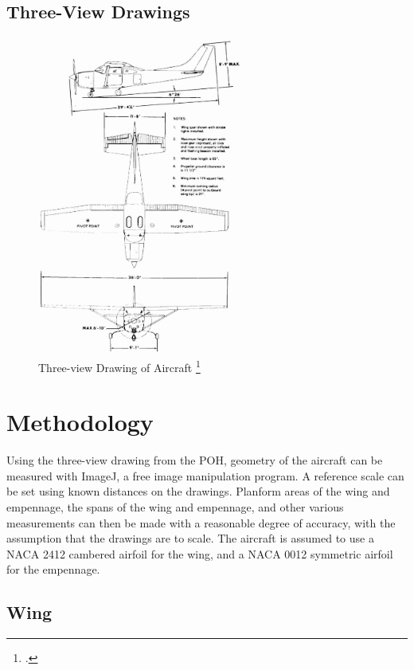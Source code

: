 \documentclass[11pt]{report}
\begin{document}
\subsection{Three-View Drawings} \label{threeview}

\begin{figure}[H]
    \centering
    \includegraphics[width = 0.6\textwidth]{Technical Drawing/ThreeView.png}
    \caption{Three-view Drawing of Aircraft \footcite{POH}}
    \label{fig:threeview}
\end{figure}


\section{Methodology}

Using the three-view drawing from the POH, geometry of the aircraft can be measured with ImageJ, a free image manipulation program. A reference scale can be set using known distances on the drawings. Planform areas of the wing and empennage, the spans of the wing and empennage, and other various measurements can then be made with a reasonable degree of accuracy, with the assumption that the drawings are to scale. The aircraft is assumed to use a NACA 2412 cambered airfoil for the wing, and a NACA 0012 symmetric airfoil for the empennage.\\

\subsection{Wing}
\end{document}
